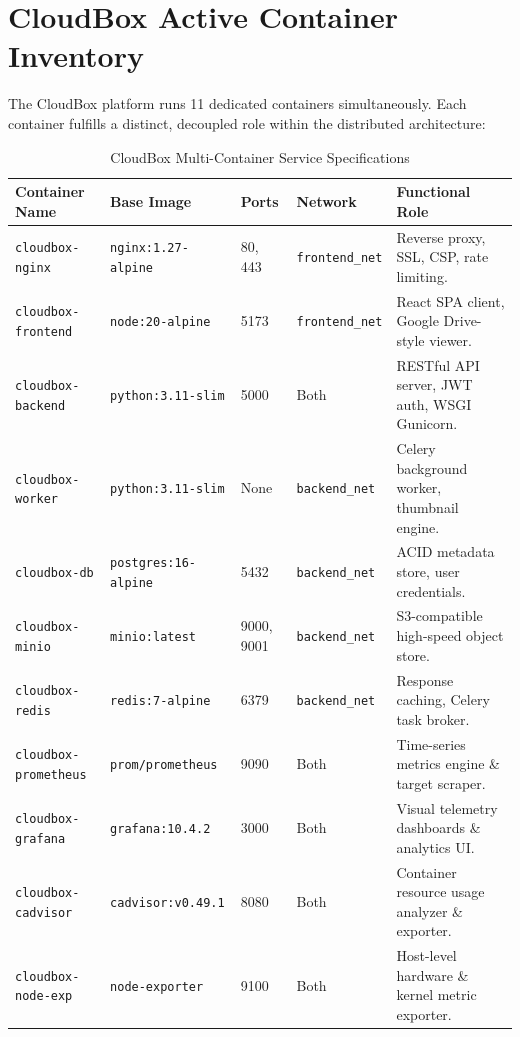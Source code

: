\documentclass[11pt,a4paper]{report}
\begin{document}
\section{CloudBox Active Container Inventory}
The CloudBox platform runs 11 dedicated containers simultaneously. Each container fulfills a distinct, decoupled role within the distributed architecture:

\begin{table}[h!]
\centering
\footnotesize
\renewcommand{\arraystretch}{0.92}
\begin{tabularx}{\textwidth}{llllX}
\toprule
\textbf{Container Name} & \textbf{Base Image} & \textbf{Ports} & \textbf{Network} & \textbf{Functional Role} \\
\midrule
\texttt{cloudbox-nginx} & \texttt{nginx:1.27-alpine} & 80, 443 & \texttt{frontend\_net} & Reverse proxy, SSL, CSP, rate limiting. \\
\texttt{cloudbox-frontend} & \texttt{node:20-alpine} & 5173 & \texttt{frontend\_net} & React SPA client, Google Drive-style viewer. \\
\texttt{cloudbox-backend} & \texttt{python:3.11-slim} & 5000 & Both & RESTful API server, JWT auth, WSGI Gunicorn. \\
\texttt{cloudbox-worker} & \texttt{python:3.11-slim} & None & \texttt{backend\_net} & Celery background worker, thumbnail engine. \\
\texttt{cloudbox-db} & \texttt{postgres:16-alpine} & 5432 & \texttt{backend\_net} & ACID metadata store, user credentials. \\
\texttt{cloudbox-minio} & \texttt{minio:latest} & 9000, 9001 & \texttt{backend\_net} & S3-compatible high-speed object store. \\
\texttt{cloudbox-redis} & \texttt{redis:7-alpine} & 6379 & \texttt{backend\_net} & Response caching, Celery task broker. \\
\texttt{cloudbox-prometheus} & \texttt{prom/prometheus} & 9090 & Both & Time-series metrics engine \& target scraper. \\
\texttt{cloudbox-grafana} & \texttt{grafana:10.4.2} & 3000 & Both & Visual telemetry dashboards \& analytics UI. \\
\texttt{cloudbox-cadvisor} & \texttt{cadvisor:v0.49.1} & 8080 & Both & Container resource usage analyzer \& exporter. \\
\texttt{cloudbox-node-exp} & \texttt{node-exporter} & 9100 & Both & Host-level hardware \& kernel metric exporter. \\
\bottomrule
\end{tabularx}
\caption{CloudBox Multi-Container Service Specifications}
\end{table}
\end{document}

